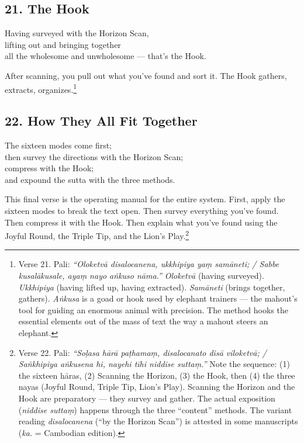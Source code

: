 \subsection*{21. The Hook}

\begin{versebox}
Having surveyed with the Horizon Scan,\\
lifting out and bringing together\\
all the wholesome and unwholesome --- that's the Hook.
\end{versebox}

After scanning, you pull out what you've found and sort it. The Hook gathers, extracts, organizes.\footnote{Verse 21. Pali: \textit{``Oloketvā disalocanena, ukkhipiya yaṃ samāneti; / Sabbe kusalākusale, ayaṃ nayo aṅkuso nāma.''} \textit{Oloketvā} (having surveyed). \textit{Ukkhipiya} (having lifted up, having extracted). \textit{Samāneti} (brings together, gathers). \textit{Aṅkusa} is a goad or hook used by elephant trainers --- the mahout's tool for guiding an enormous animal with precision. The method hooks the essential elements out of the mass of text the way a mahout steers an elephant.}

\subsection*{22. How They All Fit Together}

\begin{versebox}
The sixteen modes come first;\\
then survey the directions with the Horizon Scan;\\
compress with the Hook;\\
and expound the sutta with the three methods.
\end{versebox}

This final verse is the operating manual for the entire system. First, apply the sixteen modes to break the text open. Then survey everything you've found. Then compress it with the Hook. Then explain what you've found using the Joyful Round, the Triple Tip, and the Lion's Play.\footnote{Verse 22. Pali: \textit{``Soḷasa hārā paṭhamaṃ, disalocanato disā viloketvā; / Saṅkhipiya aṅkusena hi, nayehi tīhi niddise suttaṃ.''} Note the sequence: (1) the sixteen hāras, (2) Scanning the Horizon, (3) the Hook, then (4) the three nayas (Joyful Round, Triple Tip, Lion's Play). Scanning the Horizon and the Hook are preparatory --- they survey and gather. The actual exposition (\textit{niddise suttaṃ}) happens through the three ``content'' methods. The variant reading \textit{disalocanena} (``by the Horizon Scan'') is attested in some manuscripts (\textit{ka.} = Cambodian edition).}

